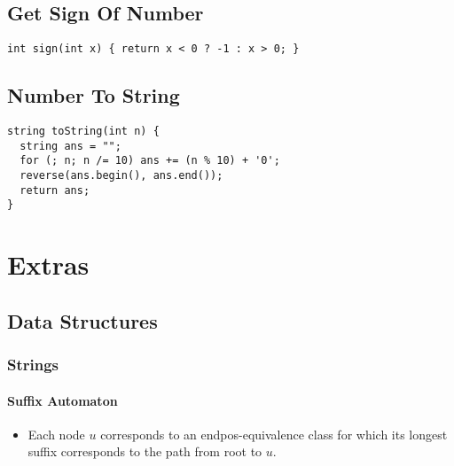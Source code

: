 \documentclass[twoside]{article}
\begin{document}
\begin{multicols*}{2}
\subsectionfont{\large\bfseries\sffamily\underline}
\subsection*{Get Sign Of Number}
\begin{verbatim}
int sign(int x) { return x < 0 ? -1 : x > 0; }
\end{verbatim}

\subsectionfont{\large\bfseries\sffamily\underline}
\subsection*{Number To String}
\begin{verbatim}
string toString(int n) {
  string ans = "";
  for (; n; n /= 10) ans += (n % 10) + '0';
  reverse(ans.begin(), ans.end());
  return ans;
}
\end{verbatim}

\end{multicols*}
\sectionfont{\bfseries\sffamily\centering\Huge}
\vspace{1em}
\section*{Extras}
\vspace{3em}
\subsectionfont{\bfseries\sffamily\centering\LARGE}
\vspace{0em}
\subsection*{Data Structures}
\vspace{2em}
\subsubsectionfont{\bfseries\sffamily\centering\Large}
\vspace{0em}
\subsubsection*{Strings}
\vspace{2em}
\paragraphfont{\large\bfseries\sffamily\underline}
\paragraph*{Suffix Automaton}
\vspace{1em}
\sffamily
\begin{itemize}[label={\bullet}]
  \item Each node $u$ corresponds to an endpos-equivalence class for which its longest suffix corresponds to the path from root to $u$.
\end{itemize}
\begin{multicols*}{2}
\end{multicols*}
\subsectionfont{\bfseries\sffamily\centering\LARGE}
\vspace{0em}
\end{document}
